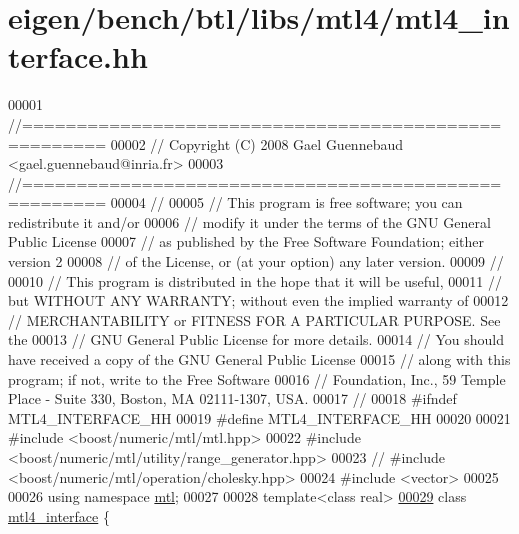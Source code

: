 \hypertarget{eigen_2bench_2btl_2libs_2mtl4_2mtl4__interface_8hh_source}{}\section{eigen/bench/btl/libs/mtl4/mtl4\+\_\+interface.hh}
\label{eigen_2bench_2btl_2libs_2mtl4_2mtl4__interface_8hh_source}

\begin{DoxyCode}
00001 \textcolor{comment}{//=====================================================}
00002 \textcolor{comment}{// Copyright (C) 2008 Gael Guennebaud <gael.guennebaud@inria.fr>}
00003 \textcolor{comment}{//=====================================================}
00004 \textcolor{comment}{//}
00005 \textcolor{comment}{// This program is free software; you can redistribute it and/or}
00006 \textcolor{comment}{// modify it under the terms of the GNU General Public License}
00007 \textcolor{comment}{// as published by the Free Software Foundation; either version 2}
00008 \textcolor{comment}{// of the License, or (at your option) any later version.}
00009 \textcolor{comment}{//}
00010 \textcolor{comment}{// This program is distributed in the hope that it will be useful,}
00011 \textcolor{comment}{// but WITHOUT ANY WARRANTY; without even the implied warranty of}
00012 \textcolor{comment}{// MERCHANTABILITY or FITNESS FOR A PARTICULAR PURPOSE.  See the}
00013 \textcolor{comment}{// GNU General Public License for more details.}
00014 \textcolor{comment}{// You should have received a copy of the GNU General Public License}
00015 \textcolor{comment}{// along with this program; if not, write to the Free Software}
00016 \textcolor{comment}{// Foundation, Inc., 59 Temple Place - Suite 330, Boston, MA  02111-1307, USA.}
00017 \textcolor{comment}{//}
00018 \textcolor{preprocessor}{#ifndef MTL4\_INTERFACE\_HH}
00019 \textcolor{preprocessor}{#define MTL4\_INTERFACE\_HH}
00020 
00021 \textcolor{preprocessor}{#include <boost/numeric/mtl/mtl.hpp>}
00022 \textcolor{preprocessor}{#include <boost/numeric/mtl/utility/range\_generator.hpp>}
00023 \textcolor{comment}{// #include <boost/numeric/mtl/operation/cholesky.hpp>}
00024 \textcolor{preprocessor}{#include <vector>}
00025 
00026 \textcolor{keyword}{using namespace }\hyperlink{namespacemtl}{mtl};
00027 
00028 \textcolor{keyword}{template}<\textcolor{keyword}{class} real>
\hyperlink{classmtl4__interface}{00029} \textcolor{keyword}{class }\hyperlink{classmtl4__interface}{mtl4\_interface} \{

\end{DoxyCode}
